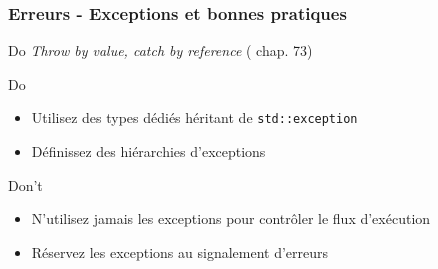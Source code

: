 \documentclass[C++.tex]{subfiles}
\begin{document}
\begin{frame}
	\frametitle{Erreurs - Exceptions et bonnes pratiques}
	\begin{exampleblock}{Do}
		\textit{Throw by value, catch by reference} (\cite{coding} chap. 73)
	\end{exampleblock}

	\begin{exampleblock}{Do}
		\begin{itemize}
			\item Utilisez des types dédiés héritant de \lstinline|std::exception|


			\item Définissez des hiérarchies d'exceptions
		\end{itemize}
	\end{exampleblock}

	\begin{alertblock}{Don't}
		\begin{itemize}
			\item N'utilisez jamais les exceptions pour contrôler le flux d'exécution
			\item Réservez les exceptions au signalement d'erreurs

		\end{itemize}
	\end{alertblock}
\end{frame}
\end{document}
